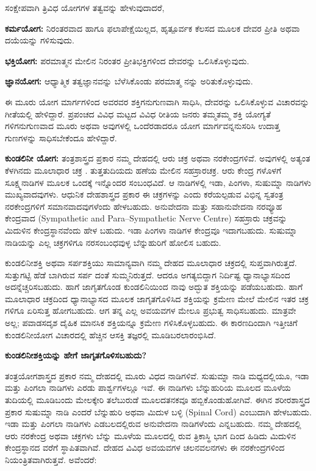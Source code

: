 ಸಂಕ್ಷೇಪವಾಗಿ ತ್ರಿವಿಧ ಯೋಗಗಳ ತತ್ವವನ್ನು ಹೇಳುವುದಾದರೆ,

 \textbf{ಕರ್ಮಯೋಗ:} ನಿರಂತರವಾದ ಹಾಗೂ ಫಲಾಪೇಕ್ಷೆಯಿಲ್ಲದ, ಹೃತ್ಪೂರ್ವಕ ಕೆಲಸದ ಮೂಲಕ ದೇವರ ಪ್ರೀತಿ ಅಥವಾ ದಯೆಯನ್ನು ಗಳಿಸುವುದು.

 \textbf{ಭಕ್ತಿಯೋಗ:} ಪರಮಾತ್ಮನ ಮೇಲಿನ ನಿರಂತರ ಪ್ರೀತಿಭಕ್ತಿಗಳಿಂದ ದೇವರನ್ನು ಒಲಿಸಿಕೊಳ್ಳುವುದು.

 \textbf{ಜ್ಞಾನಯೋಗ:} ಆಧ್ಯಾತ್ಮಿಕ ತತ್ವಜ್ಞಾನವನ್ನು ಬೆಳೆಸಿಕೊಂಡು ಪರಮಾತ್ಮ ನನ್ನು ಅರಿತುಕೊಳ್ಳುವುದು.

ಈ ಮೂರು ಯೋಗ ಮಾರ್ಗಗಳಿಂದ ಅವರವರ ಶಕ್ತಿಗನುಗುಣವಾಗಿ ಸಾಧಿಸಿ, ದೇವರನ್ನು ಒಲಿಸಿಕೊಳ್ಳುವ ವಿಚಾರವನ್ನು ಗೀತೆಯಲ್ಲಿ ಹೇಳಿದ್ದಾರೆ. ಪ್ರಪಂಚದ ವಿವಿಧ ಮಟ್ಟದ ವಿವಿಧ ರೀತಿಯ ಜನರು ತಮ್ಮತಮ್ಮ ಶಕ್ತಿ ಯೋಗ್ಯತೆ ಗಳಿಗನುಗುಣವಾದ ಮೂರು ಅಥವಾ ಅವುಗಳಲ್ಲಿ ಒಂದೆರಡಾದರೂ ಯೋಗ ಮಾರ್ಗವನ್ನನುಸರಿಸಿ ಉದಾತ್ತ ಗುಣಗಳನ್ನು ಸಾಧಿಸಬೇಕೆಂದೂ ಹೇಳಿದ್ದಾರೆ.

\textbf{ಕುಂಡಲಿನೀ ಯೋಗ:} ತಂತ್ರಶಾಸ್ತ್ರದ ಪ್ರಕಾರ ನಮ್ಮ ದೇಹದಲ್ಲಿ ಆರು ಚಕ್ರ ಅಥವಾ ನರಕೇಂದ್ರಗಳಿವೆ. ಅವುಗಳಲ್ಲಿ ಅತ್ಯಂತ ಕೆಳಗಿನದು ಮೂಲಾಧಾರ ಚಕ್ರ . ತುತ್ತತುದಿಯದು ಹಣೆಯ ಮೇಲಿನ ಸಹಸ್ರಾರಚಕ್ರ. ಆರು ಕೇಂದ್ರ ಗಳೊಳಗೆ ಸೂಕ್ಷ್ಮನಾಡಿಗಳ ಮೂಲಕ ಒಂದಕ್ಕೆ ಇನ್ನೊಂದರ ಸಂಬಂಧವಿದೆ. ಆ ನಾಡಿಗಳಲ್ಲಿ ಇಡಾ, ಪಿಂಗಳಾ, ಸುಷುಮ್ನಾ ನಾಡಿಗಳು ಮುಖ್ಯವಾದವುಗಳು. ಆಧುನಿಕ ದೇಹಶಾಸ್ತ್ರದ ಪ್ರಕಾರ ಈ ಚಕ್ರಗಳನ್ನು  ಎಂದು ಕರೆಯಲ್ಪಡುವ ವಿಭಿನ್ನ ಸ್ವತಂತ್ರ ನರಕೇಂದ್ರಗಳಿಗೆ ಸಮಾನವಾದವುಗಳೆಂದು ಹೇಳಬಹುದು. ಅನುವೇದನಾ ಮತ್ತು ಸಹಾನುವೇದನಾ ನರವ್ಯೂಹ ಕೇಂದ್ರವಾದ (Sympathetic and Para–Sympathetic Nerve Centre) ಸಹಸ್ರಾರು ಚಕ್ರವನ್ನು ಮಿದುಳಿನ ಕೇಂದ್ರಸ್ಥಾನವೆಂದು  ಹೇಳ ಬಹುದು. ಇಡಾ ಪಿಂಗಳಾ ನಾಡಿಗಳ ಕೇಂದ್ರವೂ ಇದಾಗಬಹುದು. ಸುಷುಮ್ನಾ ನಾಡಿಯನ್ನು ಎಲ್ಲ ಚಕ್ರಗಳಿಗೂ ನರಸಂಬಂಧವುಳ್ಳ ಬೆನ್ನುಹುರಿಗೆ ಹೋಲಿಸ ಬಹುದು.

ಕುಂಡಲಿನೀಶಕ್ತಿ ಅಥವಾ ಸರ್ಪಶಕ್ತಿಯು ಸಾಮಾನ್ಯವಾಗಿ ನಮ್ಮ ದೇಹದ ಮೂಲಾಧಾರ ಚಕ್ರದಲ್ಲಿ ಸುಪ್ತವಾಗಿರುತ್ತದೆ. ಸುತ್ತುಗಟ್ಟಿ ಹೆಡೆ ಬಾಗಿರುವ ಸರ್ಪ ದಂತೆ ಸುಮ್ಮನಿರುತ್ತದೆ. ಆದರೂ ಅಗತ್ಯಬಿದ್ದಾಗ ನಿರ್ದಿಷ್ಟ ಧ್ಯಾನಾಭ್ಯಾಸದಿಂದ ಅದನ್ನೆಚ್ಚರಿಸಬಹುದು. ಹಾಗೆ ಜಾಗೃತಗೊಂಡ ಕುಂಡಲಿನಿಯಿಂದ ನಾವು ಅದ್ಭುತ ಶಕ್ತಿಯನ್ನು ಪಡೆಯಬಹುದು. ಹಾಗೆ ಮೂಲಾಧಾರ ಚಕ್ರದಿಂದ ಧ್ಯಾನಾಭ್ಯಾಸದ ಮೂಲಕ ಜಾಗೃತಗೊಳಿಸಿದ ಶಕ್ತಿಯನ್ನು ಕ್ರಮೇಣ ಮೇಲೆ ಮೇಲಿನ ಇತರ ಚಕ್ರ ಗಳಿಗೂ ಏರಿಸುತ್ತ ಹೋಗಬಹುದು. ಆಗ ತನ್ನ ಎಲ್ಲ ಅವಯವಗಳ ಮೇಲೂ ಪ್ರಭುತ್ವ ಸಾಧಿಸಬಹುದು. ಮಾತ್ರವೇ ಅಲ್ಲ; ಪವಾಡಸದೃಶ ದೈಹಿಕ ಮಾನಸಿಕ ಶಕ್ತಿಯನ್ನೂ ಕ್ರಮೇಣ ಗಳಿಸಿಕೊಳ್ಳಬಹುದು. ಈ ಕಾರಣದಿಂದಾಗಿ ಇತ್ತೀಚಿಗೆ ಕುಂಡಲಿನೀಯೋಗ ವಿಚಾರದಲ್ಲಿ ಹೆಚ್ಚಿನ ಆಸಕ್ತಿ ತಜ್ಞರಲ್ಲಿ ಮೂಡಿಬರಲಾರಂಭಿಸಿದೆ.

\textbf{ಕುಂಡಲಿನೀಶಕ್ತಿಯನ್ನು ಹೇಗೆ ಜಾಗೃತಗೊಳಿಸಬಹುದು?}

ತಂತ್ರಯೋಗಶಾಸ್ತ್ರದ ಪ್ರಕಾರ ನಮ್ಮ ದೇಹದಲ್ಲಿ ಮೂರು ವಿಧದ ನಾಡಿಗಳಿವೆ. ಸುಷುಮ್ನಾ ನಾಡಿ ಮಧ್ಯದಲ್ಲಿಯೂ, ಇಡಾ ಮತ್ತು ಪಿಂಗಲಾ ನಾಡಿಗಳು ಎರಡು ಪಾರ್ಶ್ವಗಳಲ್ಲೂ ಇವೆ. ಈ ನಾಡಿಗಳು ಬೆನ್ನುಹುರಿಯ ಮೂಲದ ಮೂಳೆಯ  ತುದಿಯಲ್ಲಿ ಮೂಡಿಬಂದು ಮೇಲಕ್ಕೇರಿ ತಲೆಬುರುಡೆ  ಮೂಲದತನಕವೂ ಹಬ್ಬಿಕೊಂಡುಹೋಗಿವೆ. ಈಗಿನ ಶರೀರಶಾಸ್ತ್ರದ ಪ್ರಕಾರ ಸುಷುಮ್ನಾ ನಾಡಿ ಎಂದರೆ ಬೆನ್ನುಹುರಿ ಅಥವಾ ಮಿದುಳ ಬಳ್ಳಿ (Spinal Cord) ಎಂಬುದಾಗಿ ಹೇಳಬಹುದು. ಇಡಾ ಮತ್ತು ಪಿಂಗಲಾ ನಾಡಿಗಳು ಎಡಬಲದಲ್ಲಿರುವ ಅನುವೇದನಾ ನಾಡಿಗಳೆಂದು  ಎನ್ನಬಹುದು. ನಮ್ಮ ದೇಹದಲ್ಲಿ ಆರು ನರಕೇಂದ್ರ ಅಥವಾ ಚಕ್ರಗಳು ಬೆನ್ನು ಮೂಳೆಯ ಮೂಲದಲ್ಲಿ ರುವ ತ್ರಿಕಾಸ್ಥಿ ಭಾಗ  ದಿಂದ ಹಿಡಿದು ಮಿದುಳಿನ ಕೇಂದ್ರಸ್ಥಾನದ  ವರೆಗೆ ಸ್ಥಾಪಿತವಾಗಿವೆ. ದೇಹದ ವಿವಿಧ ಅವಯವಗಳ ಚಲನವಲನಗಳು ಈ ನರಕೇಂದ್ರಗಳಿಂದ ನಿಯಂತ್ರಿತವಾಗಿರುತ್ತವೆ. ಅವೆಂದರೆ:

